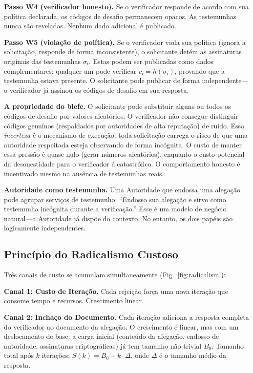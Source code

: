 \documentclass[11pt,a4paper,twocolumn]{article}
\begin{document}
\textbf{Passo W4 (verificador honesto).} Se o verificador responde de acordo com sua política declarada, os códigos de desafio permanecem opacos. As testemunhas nunca são reveladas. Nenhum dado adicional é publicado.

\textbf{Passo W5 (violação de política).} Se o verificador viola sua política (ignora a solicitação, responde de forma inconsistente), o solicitante detém as assinaturas originais das testemunhas $\sigma_i$. Estas podem ser publicadas como dados complementares: qualquer um pode verificar $c_i = h(\sigma_i)$, provando que a testemunha estava presente. O solicitante pode publicar de forma independente---o verificador já assinou os códigos de desafio em sua resposta.

\textbf{A propriedade do blefe.} O solicitante pode substituir alguns ou todos os códigos de desafio por valores aleatórios. O verificador não consegue distinguir códigos genuínos (respaldados por autoridades de alta reputação) de ruído. Essa \emph{incerteza} é o mecanismo de execução: toda solicitação carrega o risco de que uma autoridade respeitada esteja observando de forma incógnita. O custo de manter essa pressão é quase nulo (gerar números aleatórios), enquanto o custo potencial da desonestidade para o verificador é catastrófico. O comportamento honesto é incentivado mesmo na ausência de testemunhas reais.

\textbf{Autoridade como testemunha.} Uma Autoridade que endossa uma alegação pode agrupar serviços de testemunho: ``Endosso sua alegação e sirvo como testemunha incógnita durante a verificação.'' Esse é um modelo de negócio natural---a Autoridade já dispõe do contexto. No entanto, os dois papéis são logicamente independentes.

\subsection{Princípio do Radicalismo Custoso}

Três canais de custo se acumulam simultaneamente (Fig.~\ref{fig:radicalism}):

\textbf{Canal 1: Custo de Iteração.} Cada rejeição força uma nova iteração que consome tempo e recursos. Crescimento linear.

\textbf{Canal 2: Inchaço do Documento.} Cada iteração adiciona a resposta completa do verificador ao documento da alegação. O crescimento é linear, mas com um deslocamento de base: a carga inicial (conteúdo da alegação, endosso de autoridade, assinaturas criptográficas) já tem tamanho não trivial $B_0$. Tamanho total após $k$ iterações: $S(k) = B_0 + k \cdot \Delta$, onde $\Delta$ é o tamanho médio da resposta.
\end{document}
